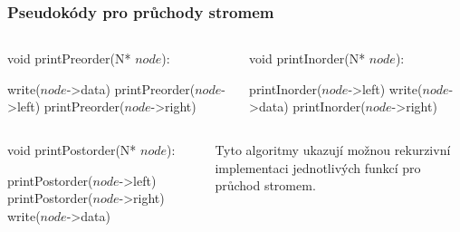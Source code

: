 \documentclass[10pt,xcolor=pdflatex,hyperref={unicode}]{beamer}
\begin{document}
\begin{frame}\frametitle{Pseudokódy pro průchody stromem}

    \begin{columns}
        \begin{column}{0.5\textwidth}
            void printPreorder(N* $node$):
            \begin{algorithmic}
                    \STATE write($node$->data)
                    \STATE printPreorder($node$->left)
                    \STATE printPreorder($node$->right)
                \ENDIF
            \end{algorithmic}
        \end{column}
        \begin{column}{0.5\textwidth}
            void printInorder(N* $node$):
            \begin{algorithmic}
                    \STATE printInorder($node$->left)
                    \STATE write($node$->data)
                    \STATE printInorder($node$->right)
                \ENDIF
            \end{algorithmic}
        \end{column}
    \end{columns}

    \vspace{35pt}
    
    \begin{columns}
        \begin{column}{0.5\textwidth}
            void printPostorder(N* $node$):
            \begin{algorithmic}
                    \STATE printPostorder($node$->left)
                    \STATE printPostorder($node$->right)
                    \STATE write($node$->data)
                \ENDIF
            \end{algorithmic}
        \end{column}
        \begin{column}{0.5\textwidth}
            \begin{block}{}
                Tyto algoritmy ukazují možnou rekurzivní implementaci jednotlivých funkcí pro průchod stromem.
            \end{block}
        \end{column}
    \end{columns}

\end{frame}
\end{document}
